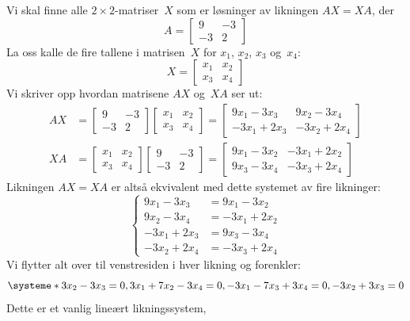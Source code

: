 \documentclass[notitlepage,a4paper,12pt,norsk]{IMFeksamen}
\newcommand{\0}{\V{0}}
\newcommand{\oppgslutt}{
\begin{center}
\pgfornament[width=6cm]{88}
\end{center}
}
\newenvironment{losning}{\begin{oppgave}}{\oppgslutt\end{oppgave}}
\begin{document}
\begin{losning}
Vi skal finne alle $2 \times 2$-matriser~$X$ som er løsninger av likningen
$AX = XA$, der
\[
A =
\begin{bmatrix}
 9 & -3 \\
-3 &  2
\end{bmatrix}
\]
La oss kalle de fire tallene i matrisen~$X$ for $x_1$, $x_2$, $x_3$ og~$x_4$:
\[
X =
\begin{bmatrix}
x_1 & x_2 \\
x_3 & x_4
\end{bmatrix}
\]
Vi skriver opp hvordan matrisene $AX$ og~$XA$ ser ut:
\begin{align*}
AX &=
\begin{bmatrix}
 9 & -3 \\
-3 &  2
\end{bmatrix}
\begin{bmatrix}
x_1 & x_2 \\
x_3 & x_4
\end{bmatrix}
=
\begin{bmatrix}
 9 x_1 - 3 x_3  &   9 x_2 - 3 x_4  \\
-3 x_1 + 2 x_3  &  -3 x_2 + 2 x_4
\end{bmatrix}
\\
XA &=
\begin{bmatrix}
x_1 & x_2 \\
x_3 & x_4
\end{bmatrix}
\begin{bmatrix}
 9 & -3 \\
-3 &  2
\end{bmatrix}
=
\begin{bmatrix}
9 x_1 - 3 x_2  &  -3 x_1 + 2 x_2  \\
9 x_3 - 3 x_4  &  -3 x_3 + 2 x_4
\end{bmatrix}
\end{align*}
Likningen $AX = XA$ er altså ekvivalent med dette systemet av fire
likninger:
\[
\left\{
\begin{aligned}
 9 x_1 - 3 x_3 &=  9 x_1 - 3 x_2 \\
 9 x_2 - 3 x_4 &= -3 x_1 + 2 x_2 \\
-3 x_1 + 2 x_3 &=  9 x_3 - 3 x_4 \\
-3 x_2 + 2 x_4 &= -3 x_3 + 2 x_4
\end{aligned}
\right.
\]
Vi flytter alt over til venstresiden i hver likning og forenkler:
\[
\systeme*{
3x_2 - 3x_3 = 0,
3x_1 + 7x_2 - 3x_4 = 0,
-3x_1 - 7x_3 + 3x_4 = 0,
-3x_2 + 3x_3 = 0
}
\]
Dette er et vanlig lineært likningssystem,

\end{losning}
\end{document}
